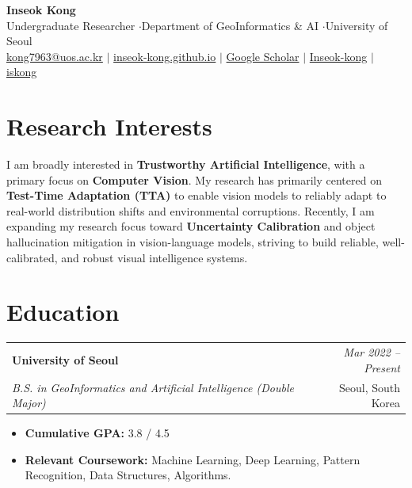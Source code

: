 \documentclass[a4paper,10pt]{article}
\makeatletter
\newcommand{\socialicon}[1]{\raisebox{-0.05em}{\resizebox{!}{0.9em}{#1}}}
\newcommand{\cvheading}[4]{
  \vspace{0.5mm}
  \begin{tabularx}{\textwidth}{@{}X r@{}}
    \textbf{#1} & \textit{\footnotesize #4} \\
    \textit{\small #2} & \footnotesize\color{subtext}#3 \\
  \end{tabularx}
  \vspace{-1.5mm}
}
\newcommand{\cvitemstart}{\begin{itemize}[leftmargin=3.5mm, itemsep=0.6mm, topsep=0.8mm]}
\newcommand{\cvitemend}{\end{itemize}\vspace{1.2mm}}
\makeatother
\begin{document}
\color{darktext}

\begin{center}
    {\Huge \bfseries \color{primary} Inseok Kong} \\[2mm]
    \small
    Undergraduate Researcher \quad$\cdot$\quad Department of GeoInformatics \& AI \quad$\cdot$\quad University of Seoul \\
    \vspace{1.5mm}
    \small{
    \socialicon{\faEnvelope} \href{mailto:kong7963@uos.ac.kr}{kong7963@uos.ac.kr} \quad$\vert$\quad
    \socialicon{\faGlobe} \href{https://inseok-kong.github.io/}{inseok-kong.github.io} \quad$\vert$\quad
    \socialicon{\faGraduationCap} \href{https://scholar.google.com/citations?user=N1GcUZgAAAAJ&hl=ko}{Google Scholar} \quad$\vert$\quad
    \socialicon{\faGithub} \href{https://github.com/Inseok-kong}{Inseok-kong} \quad$\vert$\quad
    \socialicon{\faLinkedin} \href{https://www.linkedin.com/in/iskong}{iskong}
    }
\end{center}
\vspace{-2mm}

\section{Research Interests}
\vspace{0.5mm}
I am broadly interested in \textbf{Trustworthy Artificial Intelligence}, with a primary focus on \textbf{Computer Vision}. My research has primarily centered on \textbf{Test-Time Adaptation (TTA)} to enable vision models to reliably adapt to real-world distribution shifts and environmental corruptions. Recently, I am expanding my research focus toward \textbf{Uncertainty Calibration} and object hallucination mitigation in vision-language models, striving to build reliable, well-calibrated, and robust visual intelligence systems.
\vspace{0.5mm}

\section{Education}
\cvheading{University of Seoul}{B.S. in GeoInformatics and Artificial Intelligence (Double Major)}{Seoul, South Korea}{Mar 2022 -- Present}
\cvitemstart
    \item \textbf{Cumulative GPA:} 3.8 / 4.5
    \item \textbf{Relevant Coursework:} Machine Learning, Deep Learning, Pattern Recognition, Data Structures, Algorithms.
\cvitemend
\end{document}
